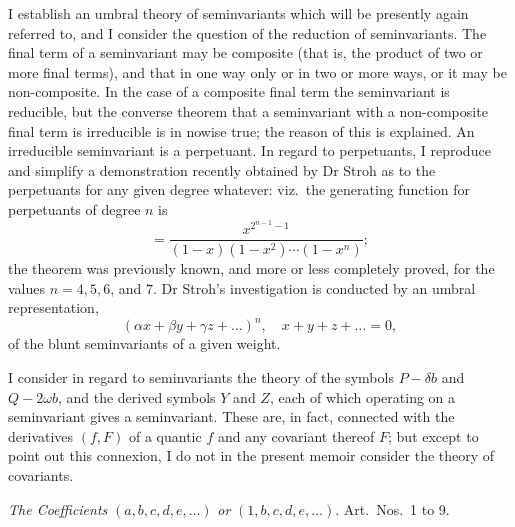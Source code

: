 \documentclass[11pt]{article}
\begin{document}
I establish an umbral theory of seminvariants which will be presently again referred to, and I consider the question of the reduction of seminvariants. The final term of a seminvariant may be composite (that is, the product of two or more final terms), and that in one way only or in two or more ways, or it may be non-composite. In the case of a composite final term the seminvariant is reducible, but the converse theorem that a seminvariant with a non-composite final term is irreducible is in nowise true; the reason of this is explained. An irreducible seminvariant is a perpetuant. In regard to perpetuants, I reproduce and simplify a demonstration recently obtained by Dr Stroh as to the perpetuants for any given degree whatever: viz.\ the generating function for perpetuants of degree $n$ is
\[
= \frac{x^{2^{n-1}-1}}{(1-x)(1-x^2)\cdots(1-x^n)};
\]
the theorem was previously known, and more or less completely proved, for the values $n = 4, 5, 6$, and $7$. Dr Stroh's investigation is conducted by an umbral representation,
\[
(\alpha x + \beta y + \gamma z + \ldots)^n,\quad x + y + z + \ldots = 0,
\]
of the blunt seminvariants of a given weight.

I consider in regard to seminvariants the theory of the symbols $P - \delta b$ and $Q - 2\omega b$, and the derived symbols $Y$ and $Z$, each of which operating on a seminvariant gives a seminvariant. These are, in fact, connected with the derivatives $(f, F)$ of a quantic $f$ and any covariant thereof $F$; but except to point out this connexion, I do not in the present memoir consider the theory of covariants.

\begin{center}
\textit{The Coefficients} $(a, b, c, d, e, \ldots)$ \textit{or} $(1, b, c, d, e, \ldots)$. \quad Art.\ Nos.\ 1 to 9.
\end{center}
\end{document}
